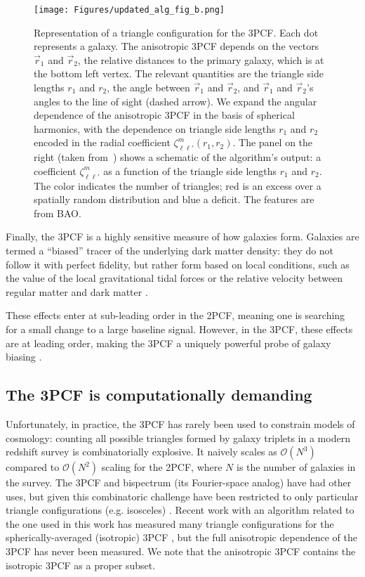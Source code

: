 \begin{figure}
\centering
\texttt{[image: Figures/updated\_alg\_fig\_b.png]}
\caption{Representation of a triangle configuration for the 3PCF. Each dot represents a galaxy. The anisotropic 3PCF depends on the vectors $\vec{r}_1$ and $\vec{r}_2$, the relative distances to the primary galaxy, which is at the bottom left vertex. The relevant quantities are the triangle side lengths $r_1$ and $r_2$, the angle between $\vec{r}_1$ and $\vec{r}_2$, and $\vec{r}_1$ and $\vec{r}_2$'s angles to the line of sight (dashed arrow). We expand the angular dependence of the anisotropic 3PCF in the basis of spherical harmonics, with the dependence on triangle side lengths $r_1$ and $r_2$ encoded in the radial coefficient $\zeta^m_{\ell \ell'}(r_1,r_2)$. The panel on the right (taken from~\cite{SE3ptalg}) shows a schematic of the algorithm's output: a coefficient $\zeta_{\ell \ell'}^m$ as a function of the triangle side lengths $r_1$ and $r_2$. The color indicates the number of triangles; red is an excess over a spatially random distribution and blue a deficit. The features are from BAO. 
\label{fig:alg_plus_eqn}}
\end{figure}


Finally, the 3PCF is a highly sensitive measure of how galaxies form. Galaxies are termed a ``biased'' tracer of the underlying dark matter density: they do not follow it with perfect fidelity, but rather form based on local conditions, such as the value of the local gravitational tidal forces or the relative velocity between regular matter and dark matter \cite{McDonald2009, TH2010}. 

 These effects enter at sub-leading order in the 2PCF, meaning one is searching for a small change to a large baseline signal. However, in the 3PCF, these effects are at leading order, making the 3PCF a uniquely powerful probe of galaxy biasing \cite{SERV,SERSDmodel}. 

 
\subsection{The 3PCF is computationally demanding}
Unfortunately, in practice, the 3PCF has rarely been used to constrain models of cosmology: counting all possible triangles formed by galaxy triplets in a modern redshift survey is combinatorially explosive. It naively scales as $\mathcal{O}(N^3)$ compared to $\mathcal{O}(N^2)$ scaling for the 2PCF, where $N$ is the number of galaxies in the survey. The 3PCF and bispectrum (its Fourier-space analog) have had other uses, but given this combinatoric challenge have been restricted to only particular triangle configurations (e.g. isosceles) \cite{McBride, GilMarin1,GilMarin2}.  
Recent work with an algorithm \cite{SE3ptalg} related to the one used in this work has measured many triangle configurations for the spherically-averaged (isotropic) 3PCF \cite{SEBaoDetxn,SERV}, but the full anisotropic dependence of the 3PCF has never been measured. We note that the anisotropic 3PCF contains the isotropic 3PCF as a proper subset. 


